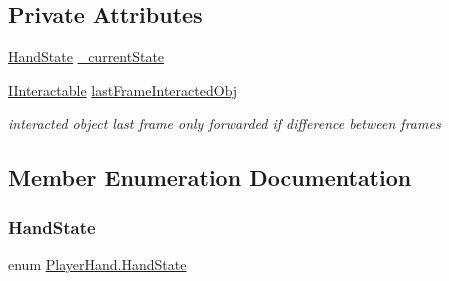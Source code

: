 \subsection*{Private Attributes}
\begin{DoxyCompactItemize}
\item 
\mbox{\hyperlink{class_player_hand_a1af76750da713cbc88856161d8d5ac0e}{Hand\+State}} \mbox{\hyperlink{class_player_hand_ab038075d9d0b60c19a1c80f6baebfa58}{\+\_\+current\+State}}
\item 
\mbox{\hyperlink{interface_i_interactable}{I\+Interactable}} \mbox{\hyperlink{class_player_hand_a0ce49de26e010945c8a499ac6182be67}{last\+Frame\+Interacted\+Obj}}
\begin{DoxyCompactList}\small\item\em interacted object last frame only forwarded if difference between frames \end{DoxyCompactList}\end{DoxyCompactItemize}


\subsection{Member Enumeration Documentation}
\mbox{\label{class_player_hand_a1af76750da713cbc88856161d8d5ac0e}} 
\subsubsection{\texorpdfstring{Hand\+State}{HandState}}
{\footnotesize\ttfamily enum \mbox{\hyperlink{class_player_hand_a1af76750da713cbc88856161d8d5ac0e}{Player\+Hand.\+Hand\+State}}\hspace{0.3cm}{\ttfamily [strong]}}


